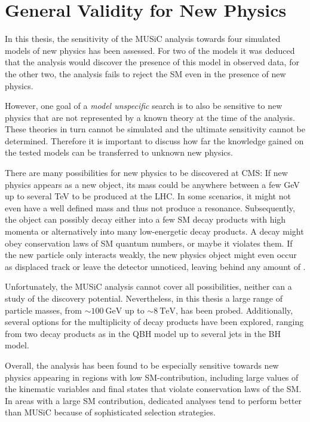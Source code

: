 \section{General Validity for New Physics}
In this thesis, the sensitivity of the \ac{MUSiC} analysis towards four simulated models of new physics has been assessed. For two of the models it was deduced that the analysis would discover the presence of this model in observed data, for the other two, the analysis fails to reject the \acl{SM} even in the presence of new physics. 

However, one goal of a \emph{model unspecific} search is to also be sensitive to new physics that are not represented by a known theory at the time of the analysis. These theories in turn cannot be simulated and the ultimate sensitivity cannot be determined.
Therefore it is important to discuss how far the knowledge gained on the tested models can be transferred to unknown new physics.

There are many possibilities for new physics to be discovered at \ac{CMS}: If new physics appears as a new object, its mass could be anywhere between a few \si{\GeV} up to several \si{\TeV} to be produced at the \ac{LHC}. In some scenarios, it might not even have a well defined mass and thus not produce a resonance. Subsequently, the object can possibly decay either into a few \ac{SM} decay products with high momenta or alternatively into many low-energetic decay products. A decay might obey conservation laws of \ac{SM} quantum numbers, or maybe it violates them. If the new particle only interacts weakly, the new physics object might even occur as displaced track or leave the detector unnoticed, leaving behind any amount of \MET.

Unfortunately, the \ac{MUSiC} analysis cannot cover all possibilities, neither can a study of the discovery potential.
Nevertheless, in this thesis a large range of particle masses, from $\sim \SI{100}{\GeV}$ up to $\sim \SI{8}{\TeV}$, has been probed. Additionally, several options for the multiplicity of decay products have been explored, ranging from two decay products as in the \ac{QBH} model up to several jets in the \ac{BH} model. 

Overall, the analysis has been found to be especially sensitive towards new physics appearing in regions with low \ac{SM}-contribution, including large values of the kinematic variables and final states that violate conservation laws of the \acl{SM}. In areas with a large \ac{SM} contribution, dedicated analyses tend to perform better than \ac{MUSiC} because of sophisticated selection strategies.

